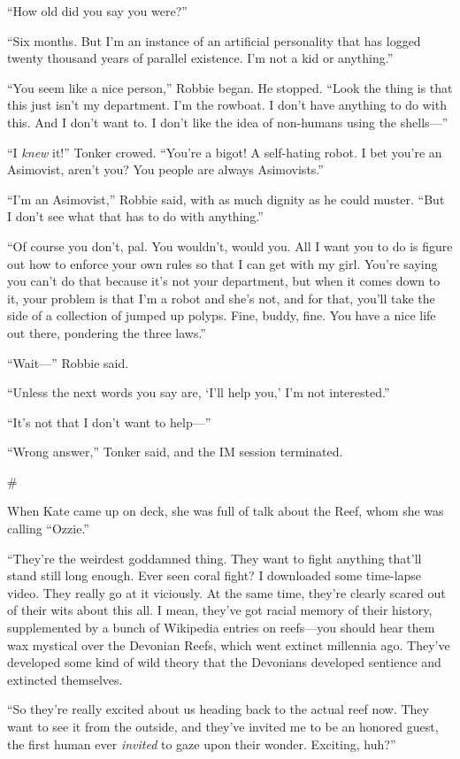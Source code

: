 “How old did you say you were?”

“Six months. But I’m an instance of an artificial personality that
has logged twenty thousand years of parallel existence. I’m not a
kid or anything.”

“You seem like a nice person,” Robbie began. He stopped. “Look the
thing is that this just isn’t my department. I’m the rowboat. I
don’t have anything to do with this. And I don’t want to. I don’t
like the idea of non-humans using the shells—”

“I \emph{knew} it!” Tonker crowed. “You’re a bigot! A self-hating
robot. I bet you’re an Asimovist, aren’t you? You people are always
Asimovists.”

“I’m an Asimovist,” Robbie said, with as much dignity as he could
muster. “But I don’t see what that has to do with anything.”

“Of course you don’t, pal. You wouldn’t, would you. All I want you
to do is figure out how to enforce your own rules so that I can get
with my girl. You’re saying you can’t do that because it’s not your
department, but when it comes down to it, your problem is that I’m
a robot and she’s not, and for that, you’ll take the side of a
collection of jumped up polyps. Fine, buddy, fine. You have a nice
life out there, pondering the three laws.”

“Wait—” Robbie said.

“Unless the next words you say are, ‘I’ll help you,’ I’m not
interested.”

“It’s not that I don’t want to help—”

“Wrong answer,” Tonker said, and the IM session terminated.

\#

When Kate came up on deck, she was full of talk about the Reef,
whom she was calling “Ozzie.”

“They’re the weirdest goddamned thing. They want to fight anything
that’ll stand still long enough. Ever seen coral fight? I
downloaded some time-lapse video. They really go at it viciously.
At the same time, they’re clearly scared out of their wits about
this all. I mean, they’ve got racial memory of their history,
supplemented by a bunch of Wikipedia entries on reefs—you should
hear them wax mystical over the Devonian Reefs, which went extinct
millennia ago. They’ve developed some kind of wild theory that the
Devonians developed sentience and extincted themselves.

“So they’re really excited about us heading back to the actual reef
now. They want to see it from the outside, and they’ve invited me
to be an honored guest, the first human ever \emph{invited} to gaze
upon their wonder. Exciting, huh?”


